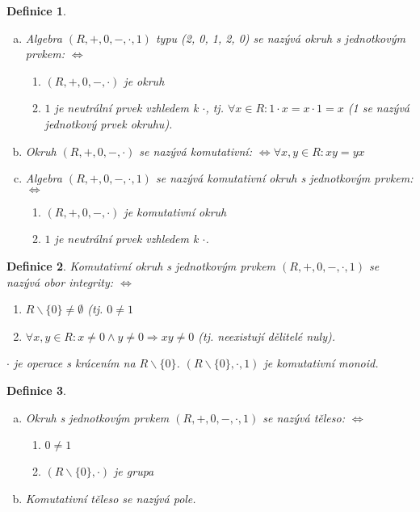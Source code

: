 \documentclass[a4paper, 11pt]{report}
\newtheorem{mydef}{Definice}[chapter]
\begin{document}
\begin{mydef}
\begin{enumerate}[a)]
	\item Algebra $(R, +, 0, -, \cdot, 1)$ typu (2, 0, 1, 2, 0) se nazývá \emph{okruh s jednotkovým prvkem}: $\Leftrightarrow$
	\begin{enumerate}[1)]
		\item $(R, +, 0, -, \cdot)$ je okruh
		\item $1$ je neutrální prvek vzhledem k $\cdot$, tj. $\forall x \in R: 1 \cdot x = x \cdot 1 = x$ (1 se nazývá \emph{jednotkový prvek} okruhu).
	\end{enumerate}
	\item Okruh $(R, +, 0, -, \cdot)$ se nazývá \emph{komutativní}: $\Leftrightarrow \forall x ,y \in R: xy = yx$
	\item Algebra $(R, +, 0, -, \cdot, 1)$ se nazývá \emph{komutativní okruh s jednotkovým prvkem}: $\Leftrightarrow$
		\begin{enumerate}[1)]
		\item $(R, +, 0, -, \cdot)$ je komutativní okruh
		\item $1$ je neutrální prvek vzhledem k $\cdot$.
	\end{enumerate}
\end{enumerate}
\end{mydef}

\begin{mydef}
Komutativní okruh s jednotkovým prvkem $(R, +, 0, -, \cdot, 1)$ se nazývá \emph{obor integrity}: $\Leftrightarrow$
\begin{enumerate}
	\item $R \backslash \{0\} \not= \emptyset$ (tj. $0 \not= 1$
	\item $\forall x,y \in R: x \not= 0 \land y \not= 0 \Rightarrow xy \not= 0$ (tj. neexistují dělitelé nuly).
\end{enumerate}
$\cdot$ je operace s krácením na $R \backslash \{0\}$.
$(R \backslash \{0\}, \cdot, 1)$ je komutativní monoid.
\end{mydef}

\begin{mydef}
\begin{enumerate}[a)]
	\item Okruh s jednotkovým prvkem $(R, +, 0, -, \cdot, 1)$ se nazývá těleso: $\Leftrightarrow$
	\begin{enumerate}[1)]
		\item $0 \not= 1$
		\item $(R \backslash \{0\}, \cdot)$ je grupa
	\end{enumerate}
	\item Komutativní těleso se nazývá \emph{pole}.
\end{enumerate}
\end{mydef}
\end{document}
